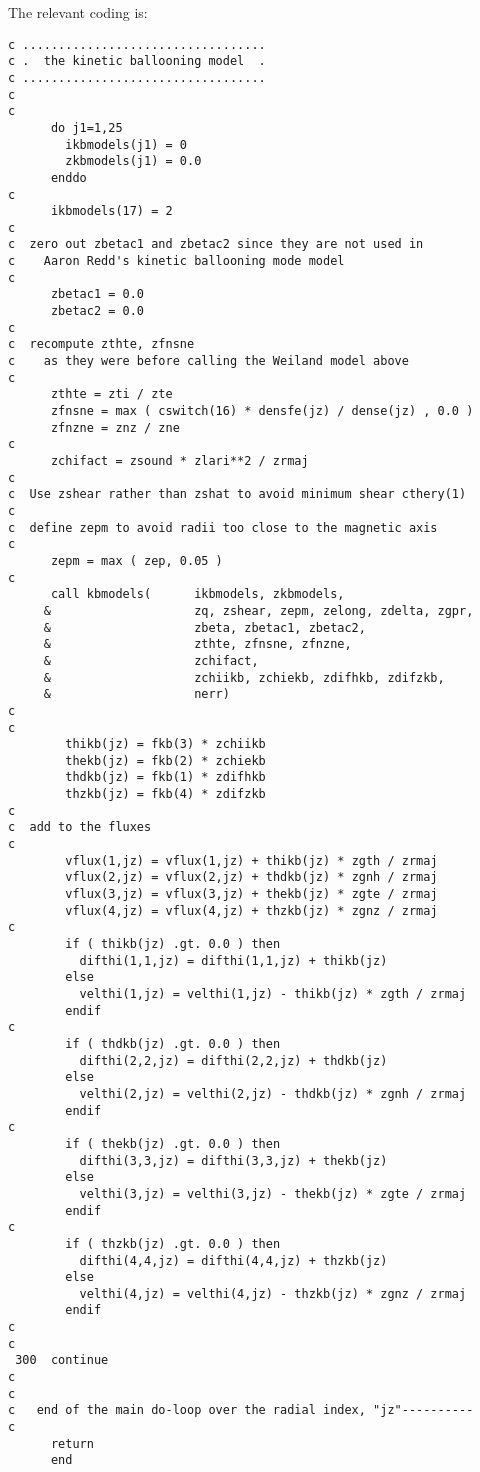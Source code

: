 The relevant coding is:

\begin{verbatim}
c ..................................
c .  the kinetic ballooning model  .
c ..................................
c
c
      do j1=1,25
        ikbmodels(j1) = 0
        zkbmodels(j1) = 0.0
      enddo
c
      ikbmodels(17) = 2
c
c  zero out zbetac1 and zbetac2 since they are not used in
c    Aaron Redd's kinetic ballooning mode model
c
      zbetac1 = 0.0
      zbetac2 = 0.0
c
c  recompute zthte, zfnsne
c    as they were before calling the Weiland model above
c
      zthte = zti / zte
      zfnsne = max ( cswitch(16) * densfe(jz) / dense(jz) , 0.0 )
      zfnzne = znz / zne
c
      zchifact = zsound * zlari**2 / zrmaj
c
c  Use zshear rather than zshat to avoid minimum shear cthery(1)
c
c  define zepm to avoid radii too close to the magnetic axis
c
      zepm = max ( zep, 0.05 )
c
      call kbmodels(      ikbmodels, zkbmodels,
     &                    zq, zshear, zepm, zelong, zdelta, zgpr,
     &                    zbeta, zbetac1, zbetac2,
     &                    zthte, zfnsne, zfnzne,
     &                    zchifact,
     &                    zchiikb, zchiekb, zdifhkb, zdifzkb,
     &                    nerr)
c
c
        thikb(jz) = fkb(3) * zchiikb
        thekb(jz) = fkb(2) * zchiekb
        thdkb(jz) = fkb(1) * zdifhkb
        thzkb(jz) = fkb(4) * zdifzkb
c
c  add to the fluxes
c
        vflux(1,jz) = vflux(1,jz) + thikb(jz) * zgth / zrmaj
        vflux(2,jz) = vflux(2,jz) + thdkb(jz) * zgnh / zrmaj
        vflux(3,jz) = vflux(3,jz) + thekb(jz) * zgte / zrmaj
        vflux(4,jz) = vflux(4,jz) + thzkb(jz) * zgnz / zrmaj
c
        if ( thikb(jz) .gt. 0.0 ) then
          difthi(1,1,jz) = difthi(1,1,jz) + thikb(jz)
        else
          velthi(1,jz) = velthi(1,jz) - thikb(jz) * zgth / zrmaj
        endif
c
        if ( thdkb(jz) .gt. 0.0 ) then
          difthi(2,2,jz) = difthi(2,2,jz) + thdkb(jz)
        else
          velthi(2,jz) = velthi(2,jz) - thdkb(jz) * zgnh / zrmaj
        endif
c
        if ( thekb(jz) .gt. 0.0 ) then
          difthi(3,3,jz) = difthi(3,3,jz) + thekb(jz)
        else
          velthi(3,jz) = velthi(3,jz) - thekb(jz) * zgte / zrmaj
        endif
c
        if ( thzkb(jz) .gt. 0.0 ) then
          difthi(4,4,jz) = difthi(4,4,jz) + thzkb(jz)
        else
          velthi(4,jz) = velthi(4,jz) - thzkb(jz) * zgnz / zrmaj
        endif
c
c
 300  continue
c
c
c   end of the main do-loop over the radial index, "jz"----------
c
      return
      end
\end{verbatim}
 
